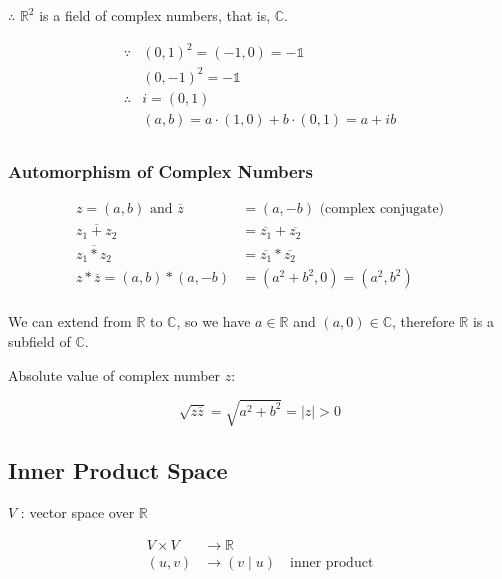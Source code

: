 \documentclass{article}
\begin{document}
    $\therefore$ $\mathbb{R}^{2}$ is a field of complex numbers, that is, $\mathbb{C}$.
    
    \begin{align*}
        \because & (0, 1)^{2} = (-1, 0) = \mathds{-1} \\
                      & (0, -1)^{2} = \mathds{-1} \\
        \therefore & i = (0, 1) \\
                        & (a, b) = a \cdot (1, 0) + b \cdot (0, 1) = a + ib \\
    \end{align*}
    
    \subsubsection{Automorphism of Complex Numbers}
    
    \begin{align*}
        z = (a, b) \text{ and } \overline{z} &= (a, -b) \text{ (complex conjugate)} \\
        \overline{z_{1} + z_{2}} &= \overline{z_{1}} + \overline{z_{2}} \\
        \overline{z_{1} * z_{2}} &= \overline{z_{1}} * \overline{z_{2}} \\
        z * \overline{z} = (a, b) * (a, -b) &= (a^{2} + b^{2}, 0) = (a^{2}, b^{2}) \\
    \end{align*}
    
    We can extend from $\mathbb{R}$ to $\mathbb{C}$, so we have $a \in \mathbb{R}$ and $(a, 0) \in \mathbb{C}$, therefore $\mathbb{R}$ is a subfield of $\mathbb{C}$.
    
    Absolute value of complex number $z$:
    
    \begin{displaymath}
        \sqrt{z \overline{z}} = \sqrt{a^{2} + b^{2}} = \left| z \right| > 0
    \end{displaymath}
    
    \subsection{Inner Product Space}
    
    $V$ : vector space over $\mathbb{R}$
    
    \begin{align*}
        V \times V &\rightarrow \mathbb{R} \\
        (u, v) &\rightarrow (v \mid u) \quad \text{inner product} \\
    \end{align*}
    
\end{document}
